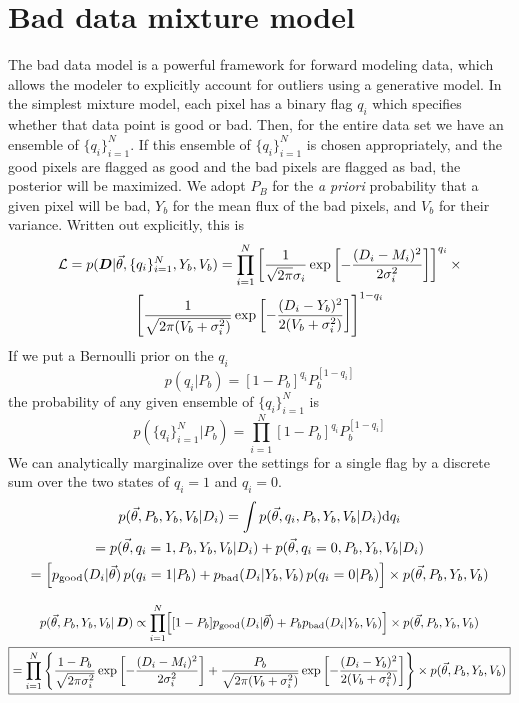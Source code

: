 \documentclass[preprint]{aastex} %
\newcommand{\qN}{\{q_i\}_{i=1}^N}
\newcommand{\vt}{\vec{\theta}}
\newcommand{\fMi}{M_i}
\newcommand{\fDi}{D_i}
\begin{document}
\section{Bad data mixture model}
The bad data model \citep{pre97,hbl10} is a powerful framework for forward modeling data, which allows the modeler to explicitly account for outliers using a generative model. In the simplest mixture model, each pixel has a binary flag $q_i$ which specifies whether that data point is good or bad. Then, for the entire data set we have an ensemble of $\qN$. If this ensemble of $\qN$ is chosen appropriately, and the good pixels are flagged as good and the bad pixels are flagged as bad, the posterior will be maximized. We adopt $P_B$ for the \emph{a priori} probability that a given pixel will be bad, $Y_b$ for the mean flux of the bad pixels, and $V_b$ for their variance. Written out explicitly, this is
\begin{multline}
  {\cal L} = p({\bm D} | \vt,\qN, Y_b,V_b) = \prod_{i=1}^N \left [ \frac{1}{\sqrt{2 \pi} \sigma_i} \exp \left[ - \frac{(\fDi - \fMi)^2}{2 \sigma_i^2} \right] \right ]^{q_i}  \times \\
  \left [ \frac{1}{\sqrt{2 \pi (V_b + \sigma_i^2)}} \exp \left[ - \frac{(\fDi - Y_b)^2}{2 (V_b + \sigma_i^2)} \right]
  \right ]^{1 - q_i}
\end{multline}
If we put a Bernoulli prior on the $q_i$
\begin{equation}
  p(q_i | P_b) = [1-P_b]^{q_i} P_b^{[1-q_i]}
\end{equation}
the probability of any given ensemble of $\qN$ is 
\begin{equation}
  p(\qN | P_b) = \prod_{i=1}^N [1-P_b]^{q_i} P_b^{[1-q_i]}
\end{equation}
We can analytically marginalize over the settings for a single flag by a discrete sum over the two states of $q_i = 1$ and $q_i = 0$. 
\begin{multline}
  p(\vt, P_b, Y_b, V_b | D_i)  =  \int p( \vt, q_i, P_b, Y_b, V_b| D_i) {\rm d} q_i \\
  = p(\vt, q_i=1, P_b, Y_b, V_b | D_i) + p(\vt, q_i=0, P_b, Y_b, V_b | D_i) \\
  = \Bigl[ p_{\rm good}(D_i | \vt)\, p(q_i=1 | P_b) +  p_{\rm bad}(D_i | Y_b, V_b)\, p(q_i=0 | P_b)\Bigr] \times p(\vt ,P_b, Y_b,V_b) 
\end{multline}

\begin{multline}
  p(\vt,P_b,Y_b,V_b|\,{\bm D}) \propto \prod_{i=1}^N \Bigl [ [1 - P_b] p_{\rm good}(D_i |\vt)  + P_b p_{\rm bad}(D_i | Y_b, V_b)\Bigr ] \times p(\vt,P_b, Y_b, V_b)\\
  \boxed{
    = \prod_{i=1}^N \left\{ \frac{1 - P_b}{\sqrt{2 \pi \sigma_i^2}} \exp \left[ - \frac{(\fDi - \fMi)^2}{2 \sigma_i^2} \right] + \frac{P_b}{\sqrt{2 \pi (V_b + \sigma_i^2)}} \exp \left[- \frac{(\fDi - Y_b)^2}{2 (V_b + \sigma_i^2)} \right] \right\}
  \times p(\vt,P_b,Y_b,V_b)}
\end{multline}
\end{document}
